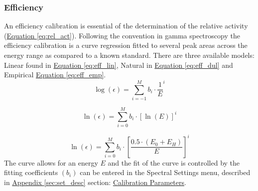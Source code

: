 \documentclass[12pt,report,justified]{SANDreport}
\begin{document}
\subsubsection{Efficiency}\label{sec:eff}
An efficiency calibration is essential of the determination of the relative activity (\hyperref[eq:rel_act]{Equation \ref{eq:rel_act}}).
Following the convention in gamma spectroscopy the efficiency calibration is a curve regression
fitted to several peak areas across the energy range as compared to a known standard. There
are three available models: Linear found in \hyperref[eq:eff_lin]{Equation \ref{eq:eff_lin}}, Natural in \hyperref[eq:eff_dul]{Equation \ref{eq:eff_dul}} and Empirical
\hyperref[eq:eff_emp]{Equation \ref{eq:eff_emp}}.
\begin{equation}
\log{\left( \epsilon \right)} = \sum_{i=-1}^M b_i \cdot \frac{1}{E}^i
\label{eq:eff_lin}
\end{equation}

\begin{equation}
\ln{\left( \epsilon \right)} = \sum_{i=0}^M b_i \cdot {\left[\ln{{\left(E\right)}}\right]}^i
\label{eq:eff_dul}
\end{equation}

\begin{equation}
\ln{\left(\epsilon \right)} = \sum_{i=0}^M b_i \cdot \left[ \frac{0.5 \cdot \left( E_0 + E_H\right)}{E} \right]^i
\label{eq:eff_emp}
\end{equation}
The curve allows for an energy \(E\) and the fit of the curve is controlled by the fitting coefficients
\(\left(b_i\right)\) can be entered in the Spectral Settings menu, described in \hyperref[sec:set_desc]{Appendix \ref{sec:set_desc}} section:
\hyperref[itm:cal_coeff]{Calibration Parameters}.
\end{document}
